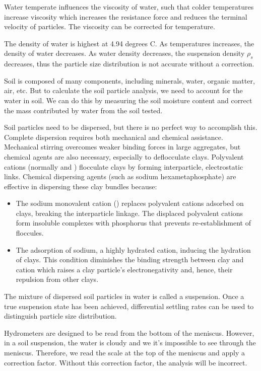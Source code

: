 \documentclass{tufte-handout}
\begin{document}
\begin{description}
	\item[Temperature and Viscosity] Water temperate influences the viscosity of water, such that colder temperatures increase viscosity which increases the resistance force and reduces the terminal velocity of particles. The viscosity can be corrected for temperature.
	\item[Temperature and Density] The density of water is highest at 4.94 degrees C. As temperatures increases, the density of water decreases. As water density decreases, the suspension density $\rho_s$ decreases, thus the particle size distribution is not accurate without a correction. 
	\item[Soil Weight and Hygroscopic Water] Soil is composed of many components, including minerals, water, organic matter, air, etc. But to calculate the soil particle analysis, we need to account for the water in soil. We can do this by measuring the soil moisture content and correct the mass contributed by water from the soil tested.
	\item[Aggregated Soil Particles] Soil particles need to be dispersed, but there is no perfect way to accomplish this. Complete dispersion requires both mechanical and chemical assistance. Mechanical stirring overcomes weaker binding forces in large aggregates, but chemical agents are also necessary, especially to deflocculate clays. Polyvalent cations (normally  and ) flocculate clays by forming interparticle, electrostatic links. Chemical dispersing agents (such as sodium hexametaphosphate) are effective in dispersing these clay bundles because:
	
	\begin{itemize}
		\item The sodium monovalent cation () replaces polyvalent cations adsorbed on clays, breaking the interparticle linkage. The displaced polyvalent cations form insoluble complexes with phosphorus that prevents re-establishment of floccules.
		\item The adsorption of sodium, a highly hydrated cation, inducing the hydration of clays. This condition diminishes the binding strength between clay and cation which raises a clay particle's electronegativity and, hence, their repulsion from other clays.
	\end{itemize}
	
The mixture of dispersed soil particles in water is called a suspension. Once a true suspension state has been achieved, differential settling rates can be used to distinguish particle size distribution.
	
	\item Hydrometers are designed to be read from the bottom of the meniscus. However, in a soil suspension, the water is cloudy and we it's impossible to see through the meniscus. Therefore, we read the scale at the top of the meniscus and apply a correction factor. Without this correction factor, the analysis will be incorrect. 
\end{description}
\end{document}
